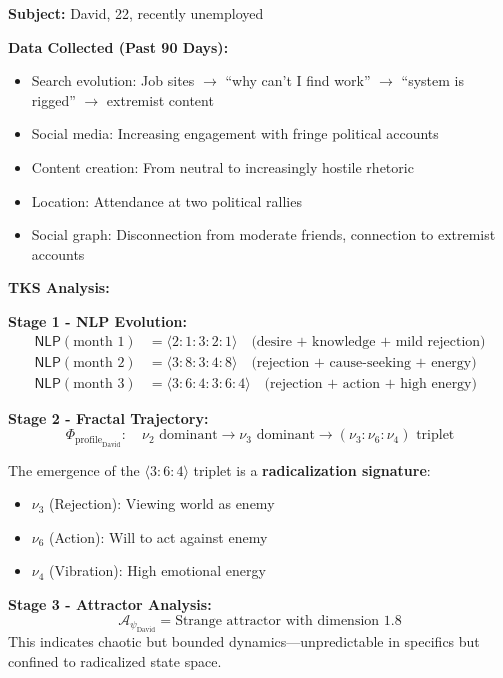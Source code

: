 \documentclass[11pt,twoside]{book}
\newcommand{\noe}[1]{\nu_{#1}}
\newcommand{\PsychAttractor}{\mathcal{A}_\psi}
\newcommand{\NLP}{\mathsf{NLP}}
\newcommand{\ProfileFrac}{\Phi_{\mathrm{profile}}}
\begin{document}
\begin{tcolorbox}[colback=yellow!5!white,colframe=yellow!65!black,title=\textbf{Scenario: Tracking David's Radicalization Risk},breakable]

\textbf{Subject:} David, 22, recently unemployed

\textbf{Data Collected (Past 90 Days):}
\begin{itemize}
    \item Search evolution: Job sites $\to$ ``why can't I find work'' $\to$ ``system is rigged'' $\to$ extremist content
    \item Social media: Increasing engagement with fringe political accounts
    \item Content creation: From neutral to increasingly hostile rhetoric
    \item Location: Attendance at two political rallies
    \item Social graph: Disconnection from moderate friends, connection to extremist accounts
\end{itemize}

\textbf{TKS Analysis:}

\textbf{Stage 1 - NLP Evolution:}
\begin{align*}
    \NLP(\text{month 1}) &= \langle 2:1:3:2:1 \rangle \quad \text{(desire + knowledge + mild rejection)} \\
    \NLP(\text{month 2}) &= \langle 3:8:3:4:8 \rangle \quad \text{(rejection + cause-seeking + energy)} \\
    \NLP(\text{month 3}) &= \langle 3:6:4:3:6:4 \rangle \quad \text{(rejection + action + high energy)}
\end{align*}

\textbf{Stage 2 - Fractal Trajectory:}
\[
    \ProfileFrac_{\text{David}} : \quad \noe{2} \text{ dominant} \to \noe{3} \text{ dominant} \to (\noe{3}:\noe{6}:\noe{4}) \text{ triplet}
\]

The emergence of the $\langle 3:6:4 \rangle$ triplet is a \textbf{radicalization signature}:
\begin{itemize}
    \item $\noe{3}$ (Rejection): Viewing world as enemy
    \item $\noe{6}$ (Action): Will to act against enemy
    \item $\noe{4}$ (Vibration): High emotional energy
\end{itemize}

\textbf{Stage 3 - Attractor Analysis:}
\[
    \PsychAttractor_{\text{David}} = \text{Strange attractor with dimension } 1.8
\]
This indicates chaotic but bounded dynamics---unpredictable in specifics but confined to radicalized state space.


\end{tcolorbox}
\end{document}

